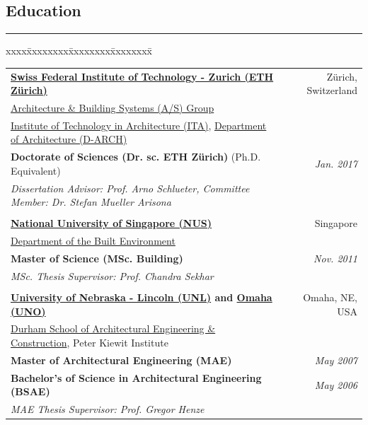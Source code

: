 \documentclass[10pt,a4paper]{article}
\begin{document}
\begin{small}


\subsection*{Education}

\hrule
\vspace{0.2cm}


\begin{tabbing}
xxxx\=xxxxxxxx\=xxxxxxxx\=xxxxxxxx\=\kill

\>\begin{tabular*}{0.9\linewidth}{l@{\extracolsep{\fill}}r}
{\bf \href{https://ethz.ch/en.html}{Swiss Federal Institute of Technology - Zurich (ETH Z\"urich)}} & Z\"urich, Switzerland \\
\href{https://systems.arch.ethz.ch}{Architecture \& Building Systems (A/S) Group} \\
\href{https://ita.arch.ethz.ch}{Institute of Technology in Architecture (ITA)}, \href{https://arch.ethz.ch/en/departement.html}{Department of Architecture (D-ARCH)}\\
\textbf{Doctorate of Sciences (Dr. sc. ETH Z\"urich)} (Ph.D. Equivalent)  &  {\it Jan. 2017}\\
\emph{Dissertation Advisor: Prof. Arno Schlueter, Committee Member: Dr. Stefan Mueller Arisona}\\
 & \\

{\bf \href{https://nus.edu.sg/}{National University of Singapore (NUS)}} & Singapore \\
\href{https://cde.nus.edu.sg/dbe/}{Department of the Built Environment} \\
\textbf{Master of Science (MSc. Building)} & {\it Nov. 2011}\\
\emph{MSc. Thesis Supervisor: Prof. Chandra Sekhar}\\
 & \\

{\bf \href{https://www.unl.edu}{University of Nebraska - Lincoln (UNL)} and \href{http://www.unomaha.edu}{Omaha (UNO)}} & Omaha, NE, USA \\ 
\href{https://engineering.unl.edu/durhamschool/}{Durham School of Architectural Engineering \& Construction}, Peter Kiewit Institute \\
\textbf{Master of Architectural Engineering (MAE)} & {\it May 2007}\\
\textbf{Bachelor's of Science in Architectural Engineering (BSAE)} & {\it May 2006}\\
\emph{MAE Thesis Supervisor: Prof. Gregor Henze}\\
\end{tabular*}
\end{tabbing}



\end{small}
\end{document}
